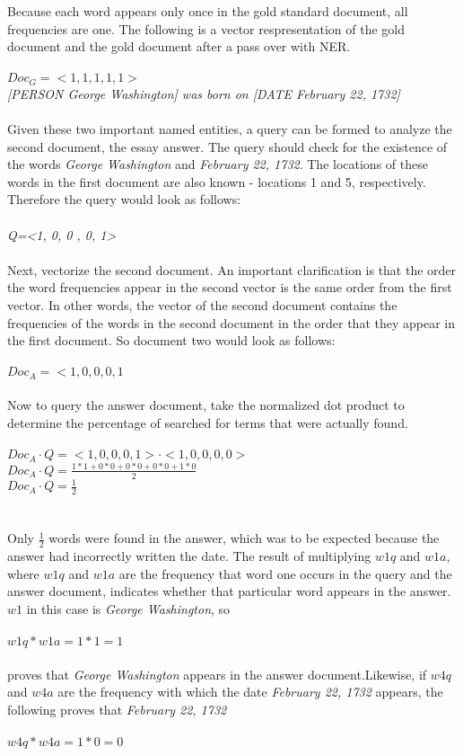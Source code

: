 Because each word appears only once in the gold standard document, all frequencies are one. The following is a vector respresentation of the gold document and the gold document after a pass over with NER.
\\\\
$Doc_G=<1, 1, 1, 1, 1>$\\
\textit{[PERSON George Washington] was born on [DATE February 22, 1732]}
\\\\
Given these two important named entities, a query can be formed to analyze the second document, the essay answer. The query should check for the existence of the words \textit{George Washington} and \textit{February 22, 1732}. The locations of these words in the first document are also known - locations 1 and 5, respectively. Therefore the query would look as follows:
\\\\
\textit{Q=<1, 0, 0 , 0, 1>}
\\\\
Next, vectorize the second document. An important clarification is that the order the word frequencies appear in the second vector is the same order from the first vector. In other words, the vector of the second document contains the frequencies of the words in the second document in the order that they appear in the first document. So document two would look as follows:
\\\\
$Doc_A=<1, 0, 0, 0, 1$
\\\\
Now to query the answer document, take the normalized dot product to determine the percentage of searched for terms that were actually found.
\\\\
$Doc_A \cdot Q = <1, 0, 0, 0, 1> \cdot <1, 0, 0, 0, 0>$\\
$Doc_A \cdot Q = \frac{1*1 + 0*0 + 0*0 + 0*0 + 1*0}{2} $\\
$Doc_A \cdot Q = \frac{1}{2}$\\
\\\\
Only $\frac{1}{2}$ words were found in the answer, which was to be expected because the answer had incorrectly written the date. The result of multiplying $w1q$ and $w1a$, where $w1q$ and $w1a$ are the frequency that word one occurs in the query and the answer document, indicates whether that particular word appears in the answer. $w1$ in this case is \textit{George Washington}, so
\\\\
$w1q * w1a = 1*1 = 1$
\\\\
proves that \textit{George Washington} appears in the answer document.Likewise, if $w4q$ and $w4a$ are the frequency with which the date \textit{February 22, 1732} appears, the following proves that \textit{February 22, 1732}
\\\\
$w4q * w4a = 1*0 = 0$
\\\

